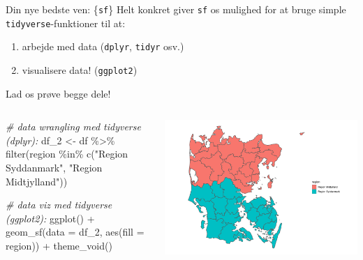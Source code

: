 \documentclass[
  8pt,
  ignorenonframetext,
  aspectratio=169]{beamer}
\newenvironment{Shaded}{}{}
\newcommand{\AttributeTok}[1]{\textcolor[rgb]{0.49,0.56,0.16}{#1}}
\newcommand{\CommentTok}[1]{\textcolor[rgb]{0.38,0.63,0.69}{\textit{#1}}}
\newcommand{\FunctionTok}[1]{\textcolor[rgb]{0.02,0.16,0.49}{#1}}
\newcommand{\NormalTok}[1]{#1}
\newcommand{\OtherTok}[1]{\textcolor[rgb]{0.00,0.44,0.13}{#1}}
\newcommand{\SpecialCharTok}[1]{\textcolor[rgb]{0.25,0.44,0.63}{#1}}
\newcommand{\StringTok}[1]{\textcolor[rgb]{0.25,0.44,0.63}{#1}}
\newcommand{\columnsbegin}{\begin{columns}}
\newcommand{\columnsend}{\end{columns}}
\begin{document}
\begin{frame}[fragile]{Din nye bedste ven: \{\texttt{sf}\}}
\protect\hypertarget{din-nye-bedste-ven-sf-2}{}
Helt konkret giver \texttt{sf} os mulighed for at bruge simple
\texttt{tidyverse}-funktioner til at:

\begin{enumerate}
\item
  arbejde med data (\texttt{dplyr}, \texttt{tidyr} osv.)
\item
  visualisere data! (\texttt{ggplot2})
\end{enumerate}

Lad os prøve begge dele!

\columnsbegin
{}

\tiny

\begin{Shaded}
\begin{Highlighting}[]
\CommentTok{\# data wrangling med tidyverse (dplyr):}
\NormalTok{df\_2 }\OtherTok{\textless{}{-}}\NormalTok{ df }\SpecialCharTok{\%\textgreater{}\%} 
  \FunctionTok{filter}\NormalTok{(region }\SpecialCharTok{\%in\%} \FunctionTok{c}\NormalTok{(}\StringTok{"Region Syddanmark"}\NormalTok{, }\StringTok{"Region Midtjylland"}\NormalTok{))}

\CommentTok{\# data viz med tidyverse (ggplot2):}
\FunctionTok{ggplot}\NormalTok{() }\SpecialCharTok{+}
  \FunctionTok{geom\_sf}\NormalTok{(}\AttributeTok{data =}\NormalTok{ df\_2, }\FunctionTok{aes}\NormalTok{(}\AttributeTok{fill =}\NormalTok{ region)) }\SpecialCharTok{+}
  \FunctionTok{theme\_void}\NormalTok{()}
\end{Highlighting}
\end{Shaded}

\normalsize


\tiny

\includegraphics{crashcourse_slides_files/figure-beamer/unnamed-chunk-14-1.pdf}

\normalsize \columnsend
\end{frame}
\end{document}
